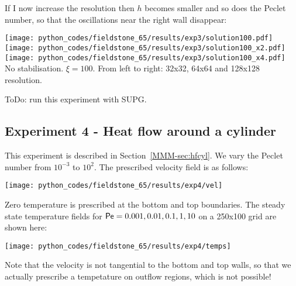 If I now increase the resolution then $h$ becomes smaller and so does the Peclet number, so that 
the oscillations near the right wall disappear:

\begin{center}
\texttt{[image: python\_codes/fieldstone\_65/results/exp3/solution100.pdf]}
\texttt{[image: python\_codes/fieldstone\_65/results/exp3/solution100\_x2.pdf]}
\texttt{[image: python\_codes/fieldstone\_65/results/exp3/solution100\_x4.pdf]}\\
{\captionfont No stabilisation. $\xi=100$. From left to right: 32x32, 64x64 and 128x128 resolution.}
\end{center}

ToDo: run this experiment with SUPG.

\subsection*{Experiment 4 - Heat flow around a cylinder} 

This experiment is described in Section~\ref{MMM-sec:hfcyl}.
We vary the Peclet number from $10^{-3}$ to $10^2$. 
The prescribed velocity field is as follows:

\begin{center}
\texttt{[image: python\_codes/fieldstone\_65/results/exp4/vel]}
\end{center}

Zero temperature is prescribed at the bottom and top boundaries.
The steady state temperature fields for ${\mathsf{Pe}}=0.001, 0.01, 0.1, 1, 10$ 
on a 250x100 grid are shown here:

\begin{center}
\texttt{[image: python\_codes/fieldstone\_65/results/exp4/temps]}
\end{center}

Note that the velocity is not tangential to the bottom and top walls, so that we actually 
prescribe a tempetature on outflow regions, which is not possible! 


